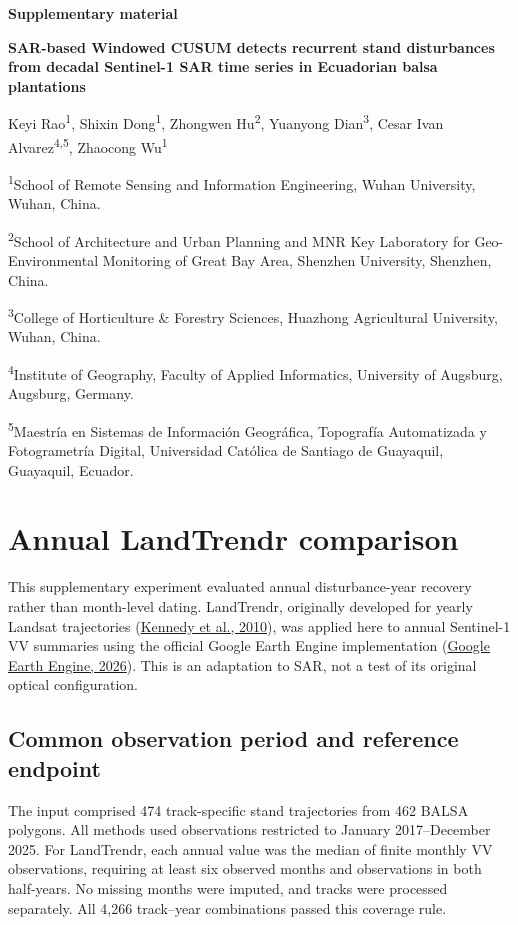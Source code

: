 \documentclass[11pt,a4paper]{article}
\begin{document}
\begin{center}
{\Large\bfseries Supplementary material\par}
\vspace{6pt}
{\large\bfseries SAR-based Windowed CUSUM detects recurrent stand disturbances from decadal Sentinel-1 SAR time series in Ecuadorian balsa plantations\par}
\vspace{8pt}
Keyi Rao\textsuperscript{1}, Shixin Dong\textsuperscript{1}, Zhongwen Hu\textsuperscript{2},
Yuanyong Dian\textsuperscript{3}, Cesar Ivan Alvarez\textsuperscript{4,5}, Zhaocong Wu\textsuperscript{1}
\end{center}
{\small
\textsuperscript{1}School of Remote Sensing and Information Engineering, Wuhan University, Wuhan, China.\par
\textsuperscript{2}School of Architecture and Urban Planning and MNR Key Laboratory for Geo-Environmental Monitoring of Great Bay Area, Shenzhen University, Shenzhen, China.\par
\textsuperscript{3}College of Horticulture \& Forestry Sciences, Huazhong Agricultural University, Wuhan, China.\par
\textsuperscript{4}Institute of Geography, Faculty of Applied Informatics, University of Augsburg, Augsburg, Germany.\par
\textsuperscript{5}Maestr\'ia en Sistemas de Informaci\'on Geogr\'afica, Topograf\'ia Automatizada y Fotogrametr\'ia Digital, Universidad Cat\'olica de Santiago de Guayaquil, Guayaquil, Ecuador.\par
}

\section{Annual LandTrendr comparison}
\label{sec:si_annual_protocol}
This supplementary experiment evaluated annual disturbance-year recovery rather than month-level dating. LandTrendr, originally developed for yearly Landsat trajectories (\hyperref[ref:kennedy]{Kennedy et al., 2010}), was applied here to annual Sentinel-1 VV summaries using the official Google Earth Engine implementation (\hyperref[ref:gee]{Google Earth Engine, 2026}). This is an adaptation to SAR, not a test of its original optical configuration.

\subsection{Common observation period and reference endpoint}
The input comprised 474 track-specific stand trajectories from 462 BALSA polygons. All methods used observations restricted to January 2017--December 2025. For LandTrendr, each annual value was the median of finite monthly VV observations, requiring at least six observed months and observations in both half-years. No missing months were imputed, and tracks were processed separately. All 4,266 track--year combinations passed this coverage rule.
\end{document}
